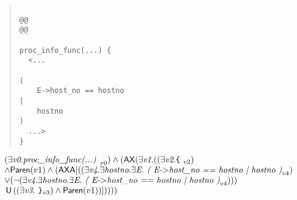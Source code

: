 \documentclass{article}
\newcommand{\U}{\,\mbox{\sf{U}}\,}
\newcommand{\A}{\mbox{\sf{A}}}
\newcommand{\AX}{\mbox{\sf{AX}}}
\newcommand{\mita}[1]{\mbox{\it{{#1}}}}
\newcommand{\msf}[1]{\mbox{\sf{{#1}}}}
\newcommand{\mth}[1]{\({#1}\)}
\newcommand{\ttlb}{\mbox{\tt \char'173}}
\newcommand{\ttrb}{\mbox{\tt \char'175}}
\begin{document}
\begin{quote}\begin{verbatim}

@@
@@

proc_info_func(...) {
  <...
    
(
    E->host_no == hostno
|
    hostno
)
  ...>
}
\end{verbatim}\end{quote}

\[\begin{array}{l}
(\exists \mita{v0} . \mita{proc\_info\_func(...) }_{v0}) \wedge (\AX(\exists \mita{v1} . ((\exists \mita{v2} . \mita{{\ttlb}
  }_{v2})\\ \wedge \msf{Paren}(v1) \wedge (\AX\A[((\exists \mita{v4} . \exists \mita{hostno} . \exists \mita{E} . \mita{
(
E-\mth{>}host\_no == hostno
|
hostno
)}_{v4})\\ \vee (\neg (\exists \mita{v4} . \exists \mita{hostno} . \exists \mita{E} . \mita{
(
E-\mth{>}host\_no == hostno
|
hostno
)}_{v4})))\\ \U ((\exists \mita{v3} . \mita{
{\ttrb}}_{v3}) \wedge \msf{Paren}(v1))]
))))
\end{array}\]
\end{document}

